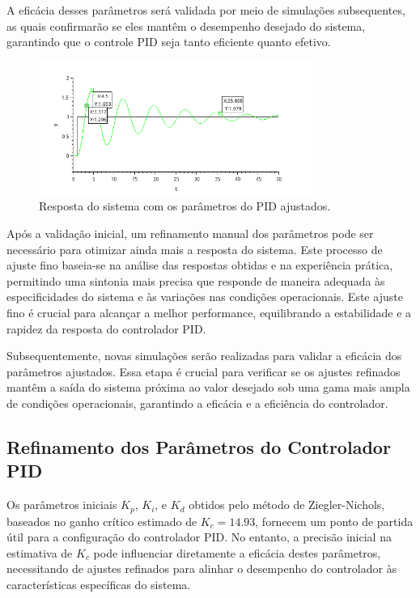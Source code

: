 A eficácia desses parâmetros será validada por meio de simulações subsequentes, as quais confirmarão se eles mantêm o desempenho desejado do sistema, garantindo que o controle PID seja tanto eficiente quanto efetivo.

\begin{figure}[H]
    \centering
    \includegraphics[width=0.8\textwidth]{6-atividade/assets/pid-valores-iniciais.png}
    \caption{Resposta do sistema com os parâmetros do PID ajustados.}
    \label{fig:resposta-pid}
\end{figure}

Após a validação inicial, um refinamento manual dos parâmetros pode ser necessário para otimizar ainda mais a resposta do sistema. Este processo de ajuste fino baseia-se na análise das respostas obtidas e na experiência prática, permitindo uma sintonia mais precisa que responde de maneira adequada às especificidades do sistema e às variações nas condições operacionais. Este ajuste fino é crucial para alcançar a melhor performance, equilibrando a estabilidade e a rapidez da resposta do controlador PID.

Subsequentemente, novas simulações serão realizadas para validar a eficácia dos parâmetros ajustados. Essa etapa é crucial para verificar se os ajustes refinados mantêm a saída do sistema próxima ao valor desejado sob uma gama mais ampla de condições operacionais, garantindo a eficácia e a eficiência do controlador.

\subsection{Refinamento dos Parâmetros do Controlador PID}
Os parâmetros iniciais \( K_p \), \( K_i \), e \( K_d \) obtidos pelo método de Ziegler-Nichols, baseados no ganho crítico estimado de \( K_c = 14.93 \), fornecem um ponto de partida útil para a configuração do controlador PID. No entanto, a precisão inicial na estimativa de \( K_c \) pode influenciar diretamente a eficácia destes parâmetros, necessitando de ajustes refinados para alinhar o desempenho do controlador às características específicas do sistema.


